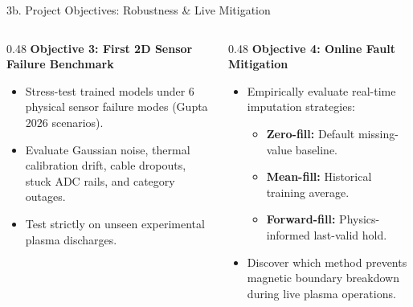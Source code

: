 \documentclass[aspectratio=169, 10pt]{beamer}
\begin{document}
\begin{frame}{3b. Project Objectives: Robustness \& Live Mitigation}
  \begin{columns}[T]
    \begin{column}{0.48\textwidth}
      \textbf{\color{NavyBlue} Objective 3: First 2D Sensor Failure Benchmark}
      \begin{itemize}
        \item Stress-test trained models under 6 physical sensor failure modes (Gupta 2026 scenarios).
        \item Evaluate Gaussian noise, thermal calibration drift, cable dropouts, stuck ADC rails, and category outages.
        \item Test strictly on unseen experimental plasma discharges.
      \end{itemize}
    \end{column}

    \begin{column}{0.48\textwidth}
      \textbf{\color{NavyBlue} Objective 4: Online Fault Mitigation}
      \begin{itemize}
        \item Empirically evaluate real-time imputation strategies:
          \begin{itemize}
            \item \textbf{Zero-fill:} Default missing-value baseline.
            \item \textbf{Mean-fill:} Historical training average.
            \item \textbf{Forward-fill:} Physics-informed last-valid hold.
          \end{itemize}
        \item Discover which method prevents magnetic boundary breakdown during live plasma operations.
      \end{itemize}
    \end{column}
  \end{columns}
\end{frame}
\end{document}

